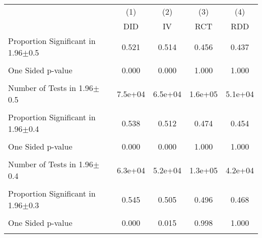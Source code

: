 {
\def\sym#1{\ifmmode^{#1}\else\(^{#1}\)\fi}
\begin{tabular}{l*{4}{c}}
\hline\hline
                &\multicolumn{1}{c}{(1)}&\multicolumn{1}{c}{(2)}&\multicolumn{1}{c}{(3)}&\multicolumn{1}{c}{(4)}\\
                &\multicolumn{1}{c}{DID}&\multicolumn{1}{c}{IV}&\multicolumn{1}{c}{RCT}&\multicolumn{1}{c}{RDD}\\
\hline
\hline Proportion Significant in 1.96$\pm$0.5&    0.521         &    0.514         &    0.456         &    0.437         \\
                &                  &                  &                  &                  \\
One Sided p-value&    0.000         &    0.000         &    1.000         &    1.000         \\
                &                  &                  &                  &                  \\
Number of Tests in 1.96$\pm$0.5&  7.5e+04         &  6.5e+04         &  1.6e+05         &  5.1e+04         \\
                &                  &                  &                  &                  \\
\hline Proportion Significant in 1.96$\pm$0.4&    0.538         &    0.512         &    0.474         &    0.454         \\
                &                  &                  &                  &                  \\
One Sided p-value&    0.000         &    0.000         &    1.000         &    1.000         \\
                &                  &                  &                  &                  \\
Number of Tests in 1.96$\pm$0.4&  6.3e+04         &  5.2e+04         &  1.3e+05         &  4.2e+04         \\
                &                  &                  &                  &                  \\
\hline Proportion Significant in 1.96$\pm$0.3&    0.545         &    0.505         &    0.496         &    0.468         \\
                &                  &                  &                  &                  \\
One Sided p-value&    0.000         &    0.015         &    0.998         &    1.000         \\
                &                  &                  &                  &                  \\

\end{tabular}}
